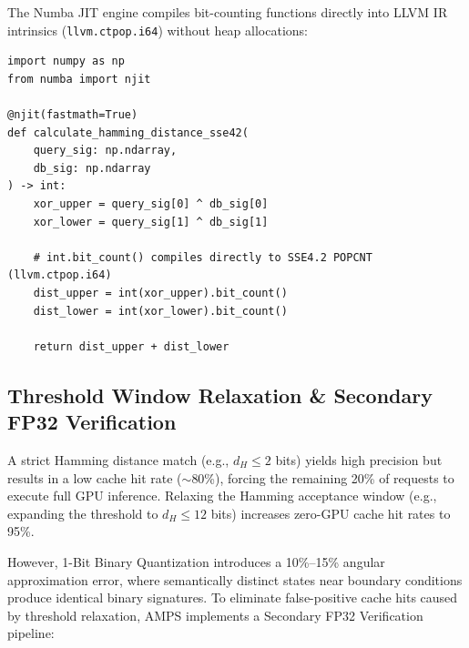 The Numba JIT engine compiles bit-counting functions directly into LLVM IR intrinsics (\texttt{llvm.ctpop.i64}) without heap allocations:

\vspace{\baselineskip}

\label{listing:hamming_sse42}
\begin{verbatim}
import numpy as np
from numba import njit

@njit(fastmath=True)
def calculate_hamming_distance_sse42(
    query_sig: np.ndarray, 
    db_sig: np.ndarray
) -> int:
    xor_upper = query_sig[0] ^ db_sig[0]
    xor_lower = query_sig[1] ^ db_sig[1]
    
    # int.bit_count() compiles directly to SSE4.2 POPCNT (llvm.ctpop.i64)
    dist_upper = int(xor_upper).bit_count()
    dist_lower = int(xor_lower).bit_count()
    
    return dist_upper + dist_lower
\end{verbatim}
\par\vspace*{\baselineskip}

\subsection{Threshold Window Relaxation \& Secondary FP32 Verification}

A strict Hamming distance match (e.g., $d_H \le 2$ bits) yields high precision but results in a low cache hit rate ($\sim$80\%), forcing the remaining 20\% of requests to execute full GPU inference. Relaxing the Hamming acceptance window (e.g., expanding the threshold to $d_H \le 12$ bits) increases zero-GPU cache hit rates to 95\%.

However, 1-Bit Binary Quantization introduces a 10\%--15\% angular approximation error, where semantically distinct states near boundary conditions produce identical binary signatures. To eliminate false-positive cache hits caused by threshold relaxation, AMPS implements a Secondary FP32 Verification pipeline:

